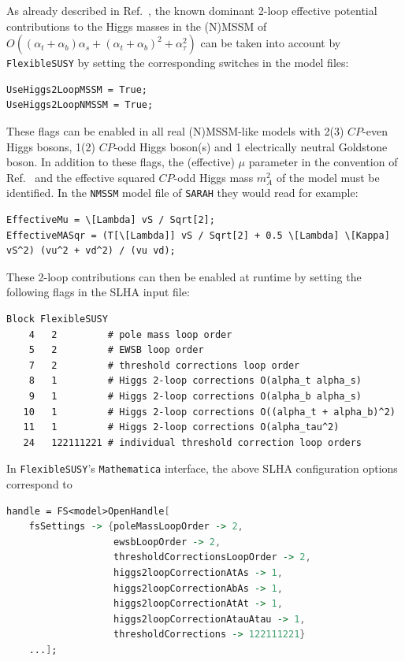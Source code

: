 \documentclass[final,3p,11pt,pdflatex]{elsarticle}
\makeatletter
\newcommand{\modelname}[1]{\texttt{#1}\@\xspace}
\newcommand{\sarah}{\texttt{SARAH}\@\xspace}
\newcommand{\fs}{\texttt{FlexibleSUSY}\@\xspace}
\newcommand{\mathematica}{\texttt{Ma\-the\-ma\-ti\-ca}\xspace}
\newcommand{\CP}{\ensuremath{CP}\xspace}
\def\at{\alpha_t}
\def\ab{\alpha_b}
\def\as{\alpha_s}
\def\atau{\alpha_{\tau}}
\makeatother
\begin{document}
As already described in Ref.~\cite{Athron:2014yba}, the known dominant 2-loop
effective potential contributions to the Higgs masses in the (N)MSSM
of $O((\at + \ab)\as + (\at +
\ab)^2 + \atau^2)$
\cite{Degrassi:2001yf,Brignole:2001jy,Dedes:2002dy,Brignole:2002bz,Dedes:2003km,Degrassi:2009yq}
can be taken into account by \fs by setting the corresponding switches
in the model files:
%
\begin{lstlisting}
UseHiggs2LoopMSSM = True;
UseHiggs2LoopNMSSM = True;
\end{lstlisting}
%
These flags can be enabled in all real (N)MSSM-like models with 2(3)
\CP-even Higgs bosons, 1(2) \CP-odd Higgs boson(s) and 1 electrically neutral
Goldstone boson.  In addition to these flags, the (effective) $\mu$
parameter in the convention of Ref.~\cite{Haber:1984rc} and the effective
squared \CP-odd Higgs mass $m_A^2$ of the model must be identified.
In the \modelname{NMSSM} model file of \sarah they would read for
example:
%
\begin{lstlisting}
EffectiveMu = \[Lambda] vS / Sqrt[2];
EffectiveMASqr = (T[\[Lambda]] vS / Sqrt[2] + 0.5 \[Lambda] \[Kappa] vS^2) (vu^2 + vd^2) / (vu vd);
\end{lstlisting}
%
These 2-loop contributions can then be enabled at runtime by setting
the following flags in the SLHA input file:
%
\begin{lstlisting}
Block FlexibleSUSY
    4   2         # pole mass loop order
    5   2         # EWSB loop order
    7   2         # threshold corrections loop order
    8   1         # Higgs 2-loop corrections O(alpha_t alpha_s)
    9   1         # Higgs 2-loop corrections O(alpha_b alpha_s)
   10   1         # Higgs 2-loop corrections O((alpha_t + alpha_b)^2)
   11   1         # Higgs 2-loop corrections O(alpha_tau^2)
   24   122111221 # individual threshold correction loop orders
\end{lstlisting}
%
In \fs's \mathematica interface, the above SLHA configuration options
correspond to
%
\begin{lstlisting}[language=Mathematica]
handle = FS<model>OpenHandle[
    fsSettings -> {poleMassLoopOrder -> 2,
                   ewsbLoopOrder -> 2,
                   thresholdCorrectionsLoopOrder -> 2,
                   higgs2loopCorrectionAtAs -> 1,
                   higgs2loopCorrectionAbAs -> 1,
                   higgs2loopCorrectionAtAt -> 1,
                   higgs2loopCorrectionAtauAtau -> 1,
                   thresholdCorrections -> 122111221}
    ...];
\end{lstlisting}
\end{document}

